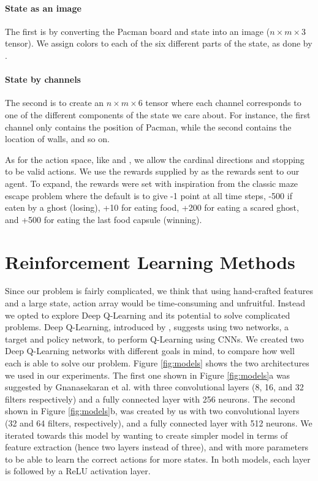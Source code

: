 \documentclass[conference]{IEEEtran}
\begin{document}
\paragraph{State as an image}
The first is by converting the Pacman board and state into an image ($n \times m \times 3$ tensor). We assign colors to each of the six different parts of the state, as done by \cite{stanford2017}.

\paragraph{State by channels}
The second is to create an $n \times m \times 6$ tensor where each channel corresponds to one of the different components of the state we care about. For instance, the first channel only contains the position of Pacman, while the second contains the location of walls, and so on.

As for the action space, like \cite{stanford2017} and \cite{berkeley_pacman}, we allow the cardinal directions and stopping to be valid actions. We use the rewards supplied by \cite{berkeley_pacman} as the rewards sent to our agent. To expand, the rewards were set with inspiration from the classic maze escape problem where the default is to give -1 point at all time steps, -500  if eaten by a ghost (losing), +10 for eating food, +200 for eating a scared ghost, and +500 for eating the last food capsule (winning).


\section{Reinforcement Learning Methods}

Since our problem is fairly complicated, we think that using hand-crafted features and a large state, action array would be time-consuming and unfruitful. Instead we opted to explore Deep Q-Learning and its potential to solve complicated problems. Deep Q-Learning, introduced by \cite{Mnih2015}, suggests using two networks, a target and policy network, to perform Q-Learning using CNNs. We created two Deep Q-Learning networks with different goals in mind, to compare how well each is able to solve our problem. Figure \ref{fig:models} shows the two architectures we used in our experiments. The first one shown in Figure \ref{fig:models}a was suggested by Gnanasekaran et al. \cite{stanford2017} with three convolutional layers (8, 16, and 32 filters respectively) and a fully connected layer with 256 neurons. The second shown in Figure \ref{fig:models}b, was created by us with two convolutional layers (32 and 64 filters, respectively), and a fully connected layer with 512 neurons. We iterated towards this model by wanting to create simpler model in terms of feature extraction (hence two layers instead of three), and with more parameters to be able to learn the correct actions for more states. In both models, each layer is followed by a ReLU activation layer.
\end{document}
